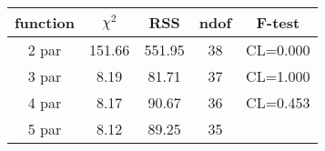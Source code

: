 \begin{tabular}{c|c|c|c|c}
function & $\chi^2$ & RSS & ndof & F-test \\
\hline
2 par & 151.66 & 551.95 & 38 & CL=0.000 \\
3 par & 8.19 & 81.71 & 37 & CL=1.000 \\
4 par & 8.17 & 90.67 & 36 & CL=0.453 \\
5 par & 8.12 & 89.25 & 35 & \\
\hline
\end{tabular}